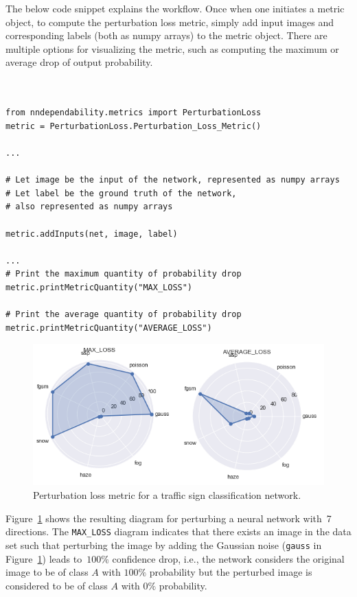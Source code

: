 \documentclass{article}
\begin{document}
The below code snippet explains the workflow. Once when one initiates a metric object, to compute the perturbation loss metric, simply add  input images and corresponding labels (both as numpy arrays) to the metric object. There are multiple options for visualizing the metric, such as computing the maximum or average drop of output probability.  

\begin{small}
\color{blue}
\begin{verbatim}


from nndependability.metrics import PerturbationLoss
metric = PerturbationLoss.Perturbation_Loss_Metric()

...

# Let image be the input of the network, represented as numpy arrays
# Let label be the ground truth of the network, 
# also represented as numpy arrays

metric.addInputs(net, image, label)

...
# Print the maximum quantity of probability drop
metric.printMetricQuantity("MAX_LOSS")

# Print the average quantity of probability drop
metric.printMetricQuantity("AVERAGE_LOSS")

\end{verbatim}
\end{small}


\begin{figure}[ht]
\centering
\includegraphics[width=12cm]{fig/PerturbationLoss.png}
\caption{Perturbation loss metric for a traffic sign classification network.}
\label{fig.perturbation}
\end{figure}

Figure~\ref{fig.perturbation} shows the resulting diagram for perturbing a neural network with~7 directions. The \texttt{MAX\_LOSS} diagram indicates that there exists an image in the data set such that perturbing the image by adding the Gaussian noise (\texttt{gauss} in Figure~\ref{fig.perturbation}) leads to~$100\%$ confidence drop, i.e., the network considers the original image to be of class $A$ with $100\%$ probability but the perturbed image is considered to be of class $A$ with $0\%$ probability. 
\end{document}
